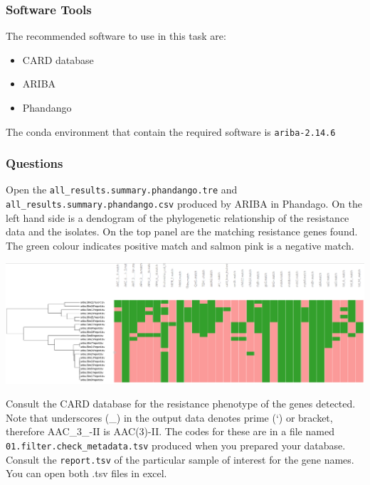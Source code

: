 \documentclass[11pt]{article}
\providecommand{\tightlist}{%
      \setlength{\itemsep}{0pt}\setlength{\parskip}{0pt}}
\begin{document}
\hypertarget{software-tools}{%
\subsubsection{Software Tools}\label{software-tools}}

The recommended software to use in this task are:

\begin{itemize}
\tightlist
\item
  CARD database
\item
  ARIBA
\item
  Phandango
\end{itemize}

The conda environment that contain the required software is
\texttt{ariba-2.14.6}

    \hypertarget{questions}{%
\subsubsection{Questions}\label{questions}}

Open the \texttt{all\_results.summary.phandango.tre} and
\texttt{all\_results.summary.phandango.csv} produced by ARIBA in
Phandago. On the left hand side is a dendogram of the phylogenetic
relationship of the resistance data and the isolates. On the top panel
are the matching resistance genes found. The green colour indicates
positive match and salmon pink is a negative match.


\begin{center}
\includegraphics[AMR results in Phandango]{img/phandango.png}
\end{center}


Consult the CARD database for the resistance phenotype of the genes
detected. Note that underscores (\_) in the output data denotes prime
(`) or bracket, therefore AAC\_3\_-II is AAC(3)-II. The codes for these
are in a file named \texttt{01.filter.check\_metadata.tsv} produced when
you prepared your database. Consult the \texttt{report.tsv} of the
particular sample of interest for the gene names. You can open both .tsv
files in excel.
\end{document}
